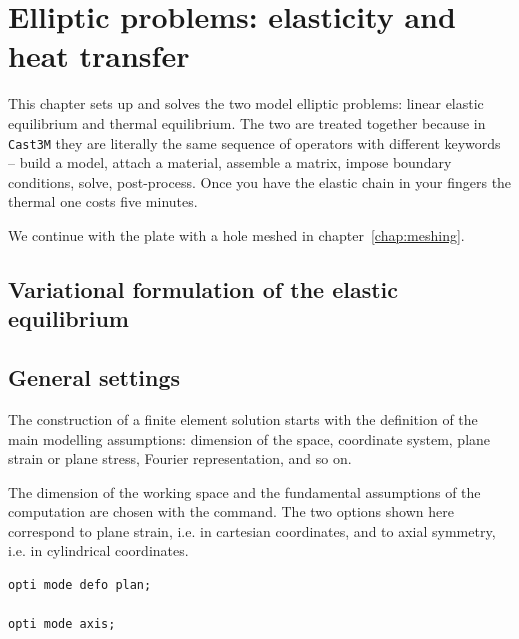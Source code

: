 \chapter{Elliptic problems: elasticity and heat transfer}
\label{chap:elasticity}


This chapter sets up and solves the two model elliptic problems: linear
elastic equilibrium and thermal equilibrium. The two are treated together
because in \texttt{Cast3M} they are literally the same sequence of operators
with different keywords -- build a model, attach a material, assemble a
matrix, impose boundary conditions, solve, post-process. Once you have the
elastic chain in your fingers the thermal one costs five minutes.

We continue with the plate with a hole meshed in
chapter~\ref{chap:meshing}.

\section{Variational formulation of the elastic equilibrium}


\section{General settings}

The construction of a finite element solution starts with the definition of
the main modelling assumptions: dimension of the space, coordinate system,
plane strain or plane stress, Fourier representation, and so on.

\begin{castemcom}
The dimension of the working space and the fundamental assumptions of the
computation are chosen with the  command. The two options shown here
correspond to plane strain, i.e. 
 in cartesian coordinates, and to
axial symmetry, i.e.   in cylindrical
coordinates.
\end{castemcom}
\begin{castemlines}
\begin{verbatim}
opti mode defo plan;

opti mode axis;
\end{verbatim}
\end{castemlines}

